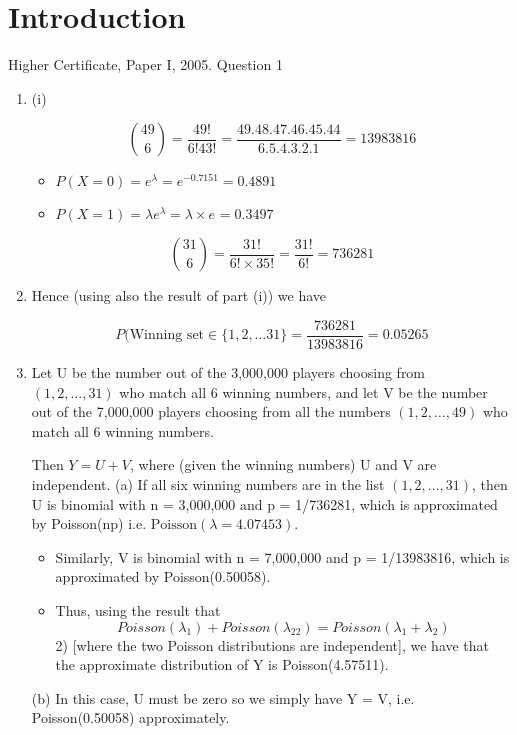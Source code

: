 \documentclass[a4paper,12pt]{article}
\begin{document}
\section{Introduction}

Higher Certificate, Paper I, 2005. Question 1
\begin{enumerate}
\item (i)


\[  { 49 \choose 6}  = \frac{49!}{6! 43!} = \frac{49.48.47.46.45.44 }{6.5.4.3.2.1} = 13983816 \]



\begin{itemize}
\item $P(X=0) = e^{\lambda} = e^{-0.7151} = 0.4891 $ 
\item $P(X=1) = \lambda e^{\lambda} = \lambda \times  e^{} = 0.3497 $ 
\end{itemize}

\[ { 31 \choose 6} = \frac{31!}{6! \times 35!}  = \frac{31!}{6!} = 736281\]


\item 

Hence (using also the result of part (i)) we have

\[ P(\mbox{Winning set} \in \{1,2,\ldots 31\} = \frac{ 736281}{13983816} =  0.05265\]

\item  Let U be the number out of the 3,000,000 players choosing from $(1, 2, \ldots, 31)$
who match all 6 winning numbers, and let V be the number out of the 7,000,000
players choosing from all the numbers $(1, 2,\ldots, 49)$ who match all 6 winning
numbers.

Then $Y = U + V$, where (given the winning numbers) U and V are independent.
(a) If all six winning numbers are in the list $(1, 2, \ldots, 31)$, then U is
binomial with n = 3,000,000 and p = 1/736281, which is approximated by
Poisson(np) i.e. $\mbox{Poisson} (\lambda = 4.07453)$.
\begin{itemize}
\item Similarly, V is binomial with n = 7,000,000 and p = 1/13983816, which is
approximated by Poisson(0.50058).
\item Thus, using the result that 
\[Poisson( \lambda_1) + Poisson( \lambda_22) = Poisson( \lambda_1 + \lambda_2)\]
2)
[where the two Poisson distributions are independent], we have that the
approximate distribution of Y is Poisson(4.57511).
\end{itemize}
(b) In this case, U must be zero so we simply have Y = V, i.e.
Poisson(0.50058) approximately.
\end{enumerate}
\end{document}
